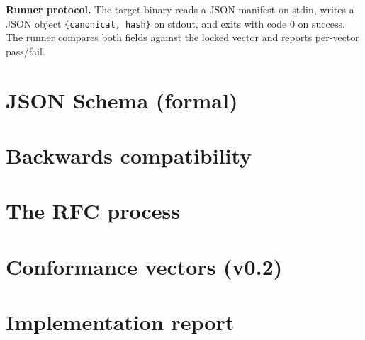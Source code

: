 \documentclass[11pt, a4paper]{article}
\begin{document}
\textbf{Runner protocol.} The target binary reads a JSON manifest on stdin, writes a JSON object \texttt{\{canonical, hash\}} on stdout, and exits with code 0 on success. The runner compares both fields against the locked vector and reports per-vector pass/fail.

\section{JSON Schema (formal)}
\label{sec:schemas}


\section{Backwards compatibility}
\label{sec:backcompat}


\section{The RFC process}
\label{sec:rfc}


\section{Conformance vectors (v0.2)}
\label{sec:vectors}


\section{Implementation report}
\label{sec:impl}

\end{document}

